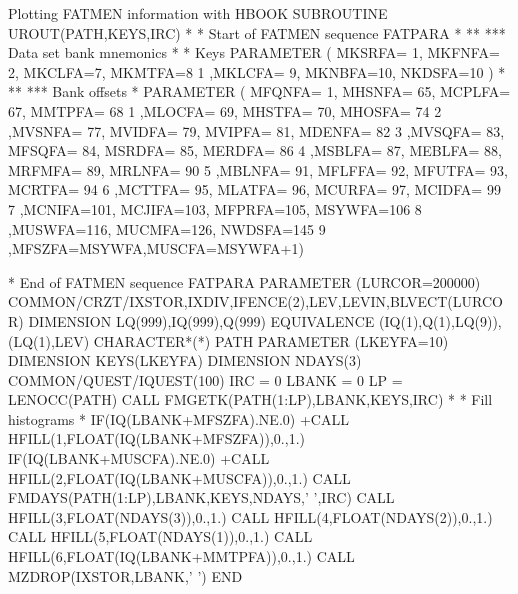 \begin{XMPt}{Plotting FATMEN information with HBOOK}
      SUBROUTINE UROUT(PATH,KEYS,IRC)
*                                                                       
* Start of FATMEN sequence FATPARA                                      
*                                                                       
** ***     Data set bank mnemonics                                      
*                                                                       
*          Keys                                                         
      PARAMETER ( MKSRFA= 1, MKFNFA= 2, MKCLFA=7, MKMTFA=8              
     1           ,MKLCFA= 9, MKNBFA=10, NKDSFA=10 )                     
*                                                                       
** ***     Bank offsets                                                 
*                                                                       
      PARAMETER ( MFQNFA=  1, MHSNFA= 65, MCPLFA= 67, MMTPFA= 68        
     1           ,MLOCFA= 69, MHSTFA= 70, MHOSFA= 74                    
     2           ,MVSNFA= 77, MVIDFA= 79, MVIPFA= 81, MDENFA= 82        
     3           ,MVSQFA= 83, MFSQFA= 84, MSRDFA= 85, MERDFA= 86        
     4           ,MSBLFA= 87, MEBLFA= 88, MRFMFA= 89, MRLNFA= 90        
     5           ,MBLNFA= 91, MFLFFA= 92, MFUTFA= 93, MCRTFA= 94        
     6           ,MCTTFA= 95, MLATFA= 96, MCURFA= 97, MCIDFA= 99        
     7           ,MCNIFA=101, MCJIFA=103, MFPRFA=105, MSYWFA=106        
     8           ,MUSWFA=116, MUCMFA=126, NWDSFA=145                    
     9           ,MFSZFA=MSYWFA,MUSCFA=MSYWFA+1)                        
                                                                        
* End of FATMEN sequence FATPARA                                        
      PARAMETER (LURCOR=200000)                                         
      COMMON/CRZT/IXSTOR,IXDIV,IFENCE(2),LEV,LEVIN,BLVECT(LURCOR)       
      DIMENSION    LQ(999),IQ(999),Q(999)                               
      EQUIVALENCE (IQ(1),Q(1),LQ(9)),(LQ(1),LEV)                        
      CHARACTER*(*) PATH
      PARAMETER     (LKEYFA=10)
      DIMENSION     KEYS(LKEYFA)
      DIMENSION     NDAYS(3)
      COMMON/QUEST/IQUEST(100)
      IRC   = 0
      LBANK = 0
      LP    = LENOCC(PATH)
      CALL FMGETK(PATH(1:LP),LBANK,KEYS,IRC)
*
*     Fill histograms
*
      IF(IQ(LBANK+MFSZFA).NE.0)
     +CALL HFILL(1,FLOAT(IQ(LBANK+MFSZFA)),0.,1.)
      IF(IQ(LBANK+MUSCFA).NE.0)
     +CALL HFILL(2,FLOAT(IQ(LBANK+MUSCFA)),0.,1.)
      CALL FMDAYS(PATH(1:LP),LBANK,KEYS,NDAYS,' ',IRC)
      CALL HFILL(3,FLOAT(NDAYS(3)),0.,1.)
      CALL HFILL(4,FLOAT(NDAYS(2)),0.,1.)
      CALL HFILL(5,FLOAT(NDAYS(1)),0.,1.)
      CALL HFILL(6,FLOAT(IQ(LBANK+MMTPFA)),0.,1.)
      CALL MZDROP(IXSTOR,LBANK,' ')
      END
\end{XMPt}
